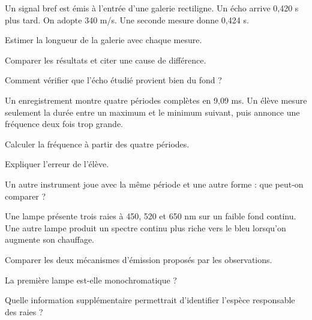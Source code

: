 \label{defi-ex-14-1}
Un signal bref est émis à l’entrée d’une galerie rectiligne. Un écho arrive 0,420 s plus tard. On adopte 340 m/s. Une seconde mesure donne 0,424 s.
\begin{questions}
\item Estimer la longueur de la galerie avec chaque mesure.
\item Comparer les résultats et citer une cause de différence.
\item Comment vérifier que l’écho étudié provient bien du fond ?
\end{questions}
\smallskip{}\hfill{}

\label{defi-ex-15-1}
Un enregistrement montre quatre périodes complètes en 9,09 ms. Un élève mesure seulement la durée entre un maximum et le minimum suivant, puis annonce une fréquence deux fois trop grande.
\begin{questions}
\item Calculer la fréquence à partir des quatre périodes.
\item Expliquer l’erreur de l’élève.
\item Un autre instrument joue avec la même période et une autre forme : que peut-on comparer ?
\end{questions}
\smallskip{}\hfill{}

\label{defi-ex-16-1}
Une lampe présente trois raies à 450, 520 et 650 nm sur un faible fond continu. Une autre lampe produit un spectre continu plus riche vers le bleu lorsqu’on augmente son chauffage.
\begin{questions}
\item Comparer les deux mécanismes d’émission proposés par les observations.
\item La première lampe est-elle monochromatique ?
\item Quelle information supplémentaire permettrait d’identifier l’espèce responsable des raies ?
\end{questions}
\smallskip{}\hfill{}

